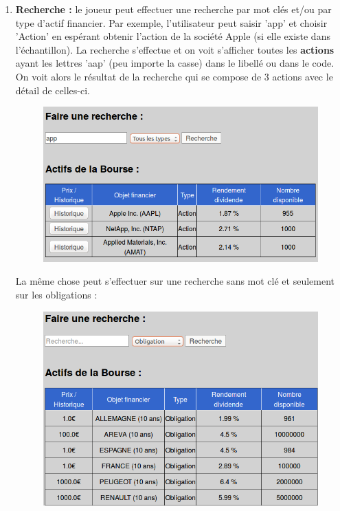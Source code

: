       \begin{enumerate}
       \item \textbf{Recherche :} le joueur peut effectuer une recherche par mot clés et/ou par type d'actif financier. Par exemple, l'utilisateur peut saisir 'app' et choisir 'Action' en espérant obtenir l'action de la société Apple (si elle existe dans l'échantillon). La recherche s'effectue et on voit s'afficher toutes les \textbf{actions} ayant les lettres 'aap' (peu importe la casse) dans le libellé ou dans le code. On voit alors le résultat de la recherche qui se compose de 3 actions avec le détail de celles-ci. 
      \begin{figure}[H]
	\center
	\includegraphics[scale=0.5]{../graph/5-rechercheactifs.png}
      \end{figure}
      
      \newpage
      La même chose peut s'effectuer sur une recherche sans mot clé et seulement sur les obligations :
      \begin{figure}[H]
	\center      
	\includegraphics[scale=0.5]{../graph/5-rechercheobligations.png}
      \end{figure}
      

\end{enumerate}
